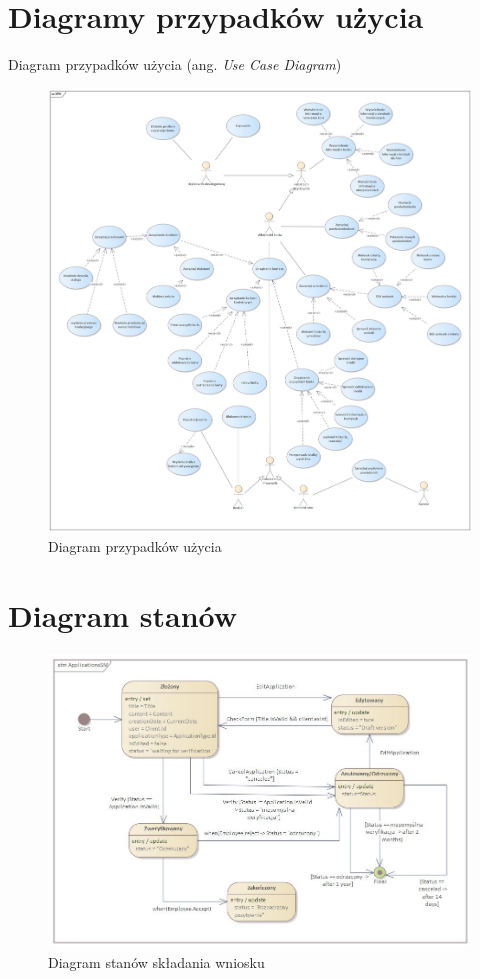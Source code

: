 \section{Diagramy przypadków użycia}
Diagram przypadków użycia (ang. \textit{Use Case Diagram})
\begin{figure}[H]
	\centering
	\includegraphics[width=1\textwidth]{images/DPU.jpg}
	\caption{Diagram przypadków użycia}
	\label{fig:UseCase}
\end{figure}
\section{Diagram stanów}
\begin{figure}[H]
	\centering
	\includegraphics[width=1\textwidth]{images/Wniosek.jpg}
	\caption{Diagram stanów składania wniosku}
	\label{fig:StateMachine}
\end{figure}
